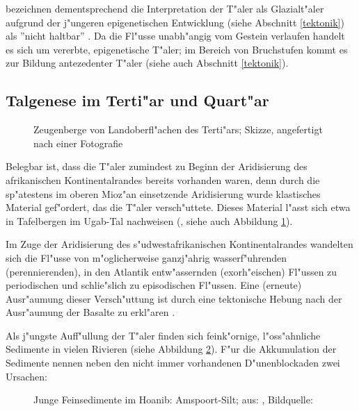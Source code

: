 \documentclass[titlepage,a4paper]{scrartcl}
\begin{document}
\cite{BrunotteAndSpoenemann1997} bezeichnen dementsprechend die Interpretation der T"aler als Glazialt"aler aufgrund der j"ungeren epigenetischen Entwicklung (siehe Abschnitt \ref{tektonik}) als ''nicht haltbar'' \citep[11]{BrunotteAndSpoenemann1997}. Da die Fl"usse unabh"angig vom Gestein verlaufen handelt es sich um vererbte, epigenetische T"aler; im Bereich von Bruchstufen kommt es zur Bildung antezedenter T"aler (siehe auch Abschnitt \ref{tektonik}).

\subsection{Talgenese im Terti"ar und Quart"ar} \label{feinsedimente}

\begin{figure}
\begin{center}
\end{center}
\caption[Skizze: Zeugenberge von Landoberfl"achen des Terti"ars]{Zeugenberge von Landoberfl"achen des Terti"ars; Skizze, angefertigt nach einer Fotografie }
\label{zeugen-skizze}
\end{figure}

Belegbar ist, dass die T"aler zumindest zu Beginn der Aridisierung des afrikanischen Kontinentalrandes bereits vorhanden waren, denn durch die sp"atestens im oberen Mioz"an einsetzende Aridisierung wurde klastisches Material gef"ordert, das die T"aler versch"uttete. Dieses Material l"asst sich etwa in Tafelbergen im Ugab-Tal nachweisen (\citealt[91]{HueserEtAl2003}, siehe auch Abbildung \ref{zeugen-skizze}).

Im Zuge der Aridisierung des s"udwestafrikanischen Kontinentalrandes wandelten sich die Fl"usse von m"oglicherweise ganzj"ahrig wasserf"uhrenden (perennierenden), in den Atlantik entw"assernden (exorh"eischen) Fl"ussen zu periodischen und schlie"slich zu episodischen Fl"ussen. Eine (erneute) Ausr"aumung dieser Versch"uttung ist durch eine tektonische Hebung nach der Ausr"aumung der Basalte zu erkl"aren \citep{HueserEtAl2003}.

Als j"ungste Auff"ullung der T"aler finden sich feink"ornige, l"oss"ahnliche Sedimente in vielen Rivieren (siehe Abbildung \ref{silt}). F"ur die Akkumulation der Sedimente nennen \cite{HueserEtAl2003} neben den nicht immer vorhandenen D"unenblockaden zwei Ursachen:

\begin{figure}
\begin{center}
\end{center}
\caption[Junge Feinsedimente: Amspoort-Silt]{Junge Feinsedimente im Hoanib: Amspoort-Silt; aus: \cite{HueserEtAl2003}, Bildquelle: }
\label{silt}
\end{figure}
\end{document}
